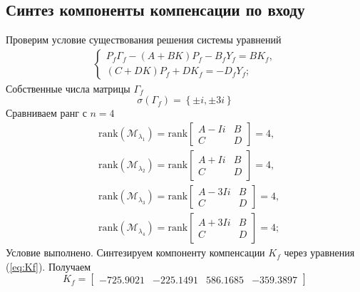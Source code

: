 \documentclass[a4paper, 12pt]{article}
\begin{document}
    \subsection{Синтез компоненты компенсации по входу}
    Проверим условие существования решения системы уравнений
    \begin{align}
        \begin{cases}
            P_f\Gamma_f-\left( A+BK \right)P_f-B_fY_f=BK_f,\\
            \left( C+DK \right)P_f+DK_f=-D_fY_f;
        \end{cases}\label{eq:Kf}
    \end{align}
    Собственные числа матрицы $\Gamma_f$
    $$
    \sigma\left( \Gamma_f \right)=\left\{ \pm i,\pm3i \right\}
    $$
    Сравниваем ранг с $n=4$
    \begin{align*}
    &\text{rank}\left( \mathcal{M}_{\lambda_1} \right)=\text{rank}\begin{bmatrix}
        A-Ii &B\\
        C &D
    \end{bmatrix}=4,\\
    &\text{rank}\left( \mathcal{M}_{\lambda_2} \right)=\text{rank}\begin{bmatrix}
        A+Ii &B\\
        C &D
    \end{bmatrix}=4,\\
    &\text{rank}\left( \mathcal{M}_{\lambda_3} \right)=\text{rank}\begin{bmatrix}
        A-3Ii &B\\
        C &D
    \end{bmatrix}=4,\\
    &\text{rank}\left( \mathcal{M}_{\lambda_4} \right)=\text{rank}\begin{bmatrix}
        A+3Ii &B\\
        C &D
    \end{bmatrix}=4;
    \end{align*}
    Условие выполнено. Синтезируем компоненту компенсации $K_f$ через уравнения (\ref{eq:Kf}).
    Получаем
    $$
    K_f=\begin{bmatrix}
        -725.9021 &-225.1491  &586.1685 &-359.3897
    \end{bmatrix}
    $$
\end{document}
